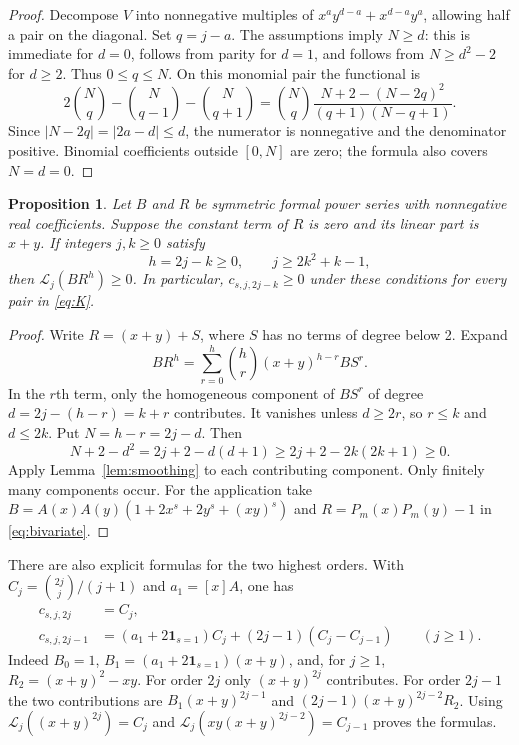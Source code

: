 \documentclass[11pt]{article}
\newtheorem{proposition}[theorem]{Proposition}
\newcommand{\Lfun}{\mathcal L}
\newcommand{\ind}{\mathbf 1}
\begin{document}
\begin{proof}
Decompose $V$ into nonnegative multiples of
$x^ay^{d-a}+x^{d-a}y^a$, allowing half a pair on the diagonal.
Set $q=j-a$. The assumptions imply $N\geq d$: this is immediate for
$d=0$, follows from parity for $d=1$, and follows from $N\geq d^2-2$
for $d\geq2$. Thus $0\leq q\leq N$. On this monomial pair the functional
is
\[
 2\binom Nq-\binom N{q-1}-\binom N{q+1}
 =\binom Nq\frac{N+2-(N-2q)^2}{(q+1)(N-q+1)}.
\]
Since $|N-2q|=|2a-d|\leq d$, the numerator is nonnegative and the
denominator positive. Binomial coefficients outside $[0,N]$ are zero;
the formula also covers $N=d=0$.
\end{proof}

\begin{proposition}\label{prop:band}
Let $B$ and $R$ be symmetric formal power series with nonnegative real
coefficients. Suppose the constant term of $R$ is zero and its linear
part is $x+y$. If integers $j,k\geq0$ satisfy
\[
 h=2j-k\geq0,\qquad j\geq2k^2+k-1,
\]
then $\Lfun_j(BR^h)\geq0$. In particular, $c_{s,j,2j-k}\geq0$ under
these conditions for every pair in \eqref{eq:K}.
\end{proposition}

\begin{proof}
Write $R=(x+y)+S$, where $S$ has no terms of degree below 2. Expand
\[
 BR^h=\sum_{r=0}^h\binom hr(x+y)^{h-r}BS^r.
\]
In the $r$th term, only the homogeneous component of $BS^r$ of degree
$d=2j-(h-r)=k+r$ contributes. It vanishes unless $d\geq2r$, so
$r\leq k$ and $d\leq2k$. Put $N=h-r=2j-d$. Then
\[
 N+2-d^2=2j+2-d(d+1)
       \geq2j+2-2k(2k+1)\geq0.
\]
Apply Lemma~\ref{lem:smoothing} to each contributing component. Only
finitely many components occur. For the application take
$B=A(x)A(y)(1+2x^s+2y^s+(xy)^s)$ and
$R=P_m(x)P_m(y)-1$ in \eqref{eq:bivariate}.
\end{proof}

There are also explicit formulas for the two highest orders. With
$C_j=\binom{2j}j/(j+1)$ and $a_1=[x]A$, one has
\begin{align}
 c_{s,j,2j}&=C_j,\label{eq:top}\\
 c_{s,j,2j-1}&=(a_1+2\ind_{s=1})C_j
              +(2j-1)(C_j-C_{j-1})\qquad(j\geq1).\label{eq:nexttop}
\end{align}
Indeed $B_0=1$, $B_1=(a_1+2\ind_{s=1})(x+y)$, and, for $j\geq1$,
$R_2=(x+y)^2-xy$. For order $2j$ only $(x+y)^{2j}$ contributes.
For order $2j-1$ the two contributions are
$B_1(x+y)^{2j-1}$ and $(2j-1)(x+y)^{2j-2}R_2$.
Using $\Lfun_j((x+y)^{2j})=C_j$ and
$\Lfun_j(xy(x+y)^{2j-2})=C_{j-1}$ proves the formulas.
\end{document}
